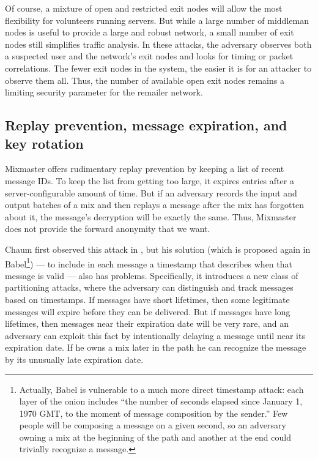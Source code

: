 \documentclass[final,inpress,inline]{ieee}
\begin{document}

Of course, a mixture of open and restricted exit nodes will allow the
most flexibility for volunteers running servers. But while a large number
of middleman nodes is useful to provide a large and robust network, a
small number of exit nodes still simplifies traffic analysis.
In these attacks, the adversary observes both a suspected user and the
network's exit nodes and looks for timing or packet correlations.  The fewer
exit nodes in the system, the easier it is for an attacker to observe them
all.  Thus, the
number of available open exit nodes remains a limiting security parameter
for the remailer network.

\subsection{Replay prevention, message expiration, and key rotation}
\label{subsec:replay}

Mixmaster offers rudimentary replay prevention by keeping a list of recent
message IDs. To keep the list from getting too large, it expires entries
after a server-configurable amount of time. But if an adversary records
the input and output batches of a mix and then replays a message after
the mix has forgotten about it, the message's decryption will be exactly
the same. Thus, Mixmaster does not provide the forward anonymity that we want.

Chaum first observed this attack in \cite{chaum-mix},
but his solution (which is proposed again in Babel\footnote{
  Actually, Babel is vulnerable to a much more direct timestamp attack:
  each layer of the onion includes ``the number of seconds
  elapsed since January 1, 1970 GMT, to the moment of message composition
  by the sender.'' Few people will be composing a message on a given
  second, so an adversary owning a mix at the beginning of the path and
  another at the end could trivially recognize a message.
}) --- to include in each message a timestamp that describes when that message
is valid --- also has problems. Specifically, it introduces a new class
of partitioning attacks, where the adversary can distinguish and
track messages based on timestamps.  If messages have short lifetimes,
then some legitimate messages will expire before they can be
delivered. But if messages have long lifetimes, then messages near
their expiration date will be very rare, and an adversary can exploit
this fact by intentionally delaying a message until near its expiration
date. If he owns a mix later in the path he can
recognize the message by its unusually late expiration date.
\end{document}

